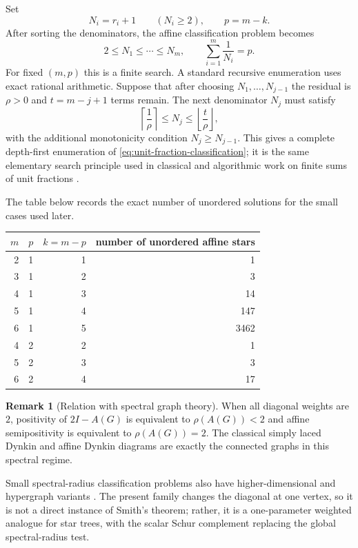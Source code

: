 \documentclass[11pt,a4paper]{article}
\theoremstyle{definition}
\newtheorem{remark}[definition]{Remark}
\theoremstyle{plain}
\begin{document}
Set
\begin{equation}
        N_i=r_i+1\qquad (N_i\ge2), \qquad p=m-k.
\end{equation}
After sorting the denominators, the affine classification problem becomes
\begin{equation}
        2\le N_1\le\cdots\le N_m, \qquad
        \sum_{i=1}^m \frac1{N_i}=p.
\label{eq:unit-fraction-classification}
\end{equation}
For fixed $(m,p)$ this is a finite search.  A standard recursive enumeration uses exact rational arithmetic.  Suppose that after choosing $N_1,\ldots,N_{j-1}$ the residual is $\rho>0$ and $t=m-j+1$ terms remain.  The next denominator $N_j$ must satisfy
\begin{equation}
        \left\lceil\frac1\rho\right\rceil \le N_j \le
        \left\lfloor\frac{t}{\rho}\right\rfloor,
\label{eq:egyptian-bounds}
\end{equation}
with the additional monotonicity condition $N_j\ge N_{j-1}$.  This gives a complete depth-first enumeration of \eqref{eq:unit-fraction-classification}; it is the same elementary search principle used in classical and algorithmic work on finite sums of unit fractions \citep{Kellogg1921,Curtiss1922,Graham1964,Eppstein1995,Sandor2003,Bloom2022}.

The table below records the exact number of unordered solutions for the small cases used later.
\begin{center}
\begin{tabular}{@{}r r r r@{}}
\toprule
$m$ & $p$ & $k=m-p$ & number of unordered affine stars\\
\midrule
2 & 1 & 1 & 1\\
3 & 1 & 2 & 3\\
4 & 1 & 3 & 14\\
5 & 1 & 4 & 147\\
6 & 1 & 5 & 3462\\
4 & 2 & 2 & 1\\
5 & 2 & 3 & 3\\
6 & 2 & 4 & 17\\
\bottomrule
\end{tabular}
\end{center}

\begin{remark}[Relation with spectral graph theory]
When all diagonal weights are $2$, positivity of $2I-A(G)$ is equivalent to $\rho(A(G))<2$ and affine semipositivity is equivalent to $\rho(A(G))=2$.  The classical simply laced Dynkin and affine Dynkin diagrams are exactly the connected graphs in this spectral regime.  

Small spectral-radius classification problems also have higher-dimensional and hypergraph variants \citep{LuMan2016}.  The present family changes the diagonal at one vertex, so it is not a direct instance of Smith's theorem; rather, it is a one-parameter weighted analogue for star trees, with the scalar Schur complement replacing the global spectral-radius test.
\end{remark}
\end{document}
